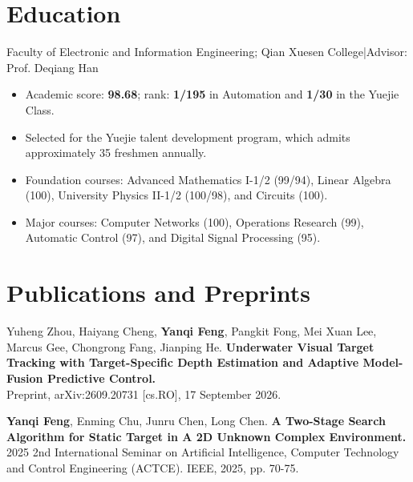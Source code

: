 \documentclass[10pt,a4paper]{article}
\begin{document}
\fontsize{10}{12.1}\selectfont
{}

\section{Education}
\vspace{3pt}
{\small\color{muted}Faculty of Electronic and Information Engineering; Qian Xuesen College\quad |\quad Advisor: Prof. Deqiang Han}
\begin{itemize}
  \item Academic score: \textbf{98.68}; rank: \textbf{1/195} in Automation and \textbf{1/30} in the Yuejie Class.
  \item Selected for the Yuejie talent development program, which admits approximately 35 freshmen annually.
  \item Foundation courses: Advanced Mathematics I-1/2 (99/94), Linear Algebra (100), University Physics II-1/2 (100/98), and Circuits (100).
  \item Major courses: Computer Networks (100), Operations Research (99), Automatic Control (97), and Digital Signal Processing (95).
\end{itemize}

\section{Publications and Preprints}
\begin{enumerate}[label={[\arabic*]}]
  \item Yuheng Zhou, Haiyang Cheng, \textbf{Yanqi Feng}, Pangkit Fong, Mei Xuan Lee, Marcus Gee, Chongrong Fang, Jianping He. \textbf{Underwater Visual Target Tracking with Target-Specific Depth Estimation and Adaptive Model-Fusion Predictive Control.}\\
  Preprint, arXiv:2609.20731 [cs.RO], 17 September 2026. 
  \item \textbf{Yanqi Feng}, Enming Chu, Junru Chen, Long Chen. \textbf{A Two-Stage Search Algorithm for Static Target in A 2D Unknown Complex Environment.} 2025 2nd International Seminar on Artificial Intelligence, Computer Technology and Control Engineering (ACTCE). IEEE, 2025, pp. 70-75. 
\end{enumerate}
\end{document}

